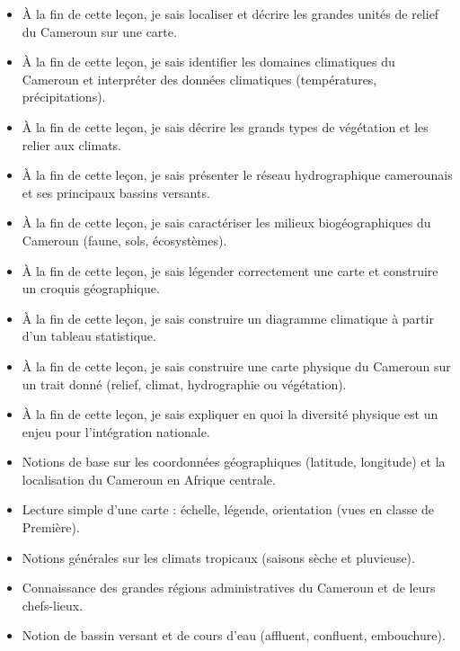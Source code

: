 \documentclass[11pt]{article}
\begin{document}
\begin{objectifs}
\begin{itemize}
\item À la fin de cette leçon, je sais localiser et décrire les grandes unités de relief du Cameroun sur une carte.
\item À la fin de cette leçon, je sais identifier les domaines climatiques du Cameroun et interpréter des données climatiques (températures, précipitations).
\item À la fin de cette leçon, je sais décrire les grands types de végétation et les relier aux climats.
\item À la fin de cette leçon, je sais présenter le réseau hydrographique camerounais et ses principaux bassins versants.
\item À la fin de cette leçon, je sais caractériser les milieux biogéographiques du Cameroun (faune, sols, écosystèmes).
\item À la fin de cette leçon, je sais légender correctement une carte et construire un croquis géographique.
\item À la fin de cette leçon, je sais construire un diagramme climatique à partir d'un tableau statistique.
\item À la fin de cette leçon, je sais construire une carte physique du Cameroun sur un trait donné (relief, climat, hydrographie ou végétation).
\item À la fin de cette leçon, je sais expliquer en quoi la diversité physique est un enjeu pour l'intégration nationale.
\end{itemize}
\end{objectifs}

\begin{prerequis}
\begin{itemize}
\item Notions de base sur les coordonnées géographiques (latitude, longitude) et la localisation du Cameroun en Afrique centrale.
\item Lecture simple d'une carte : échelle, légende, orientation (vues en classe de Première).
\item Notions générales sur les climats tropicaux (saisons sèche et pluvieuse).
\item Connaissance des grandes régions administratives du Cameroun et de leurs chefs-lieux.
\item Notion de bassin versant et de cours d'eau (affluent, confluent, embouchure).
\end{itemize}
\end{prerequis}
\end{document}

